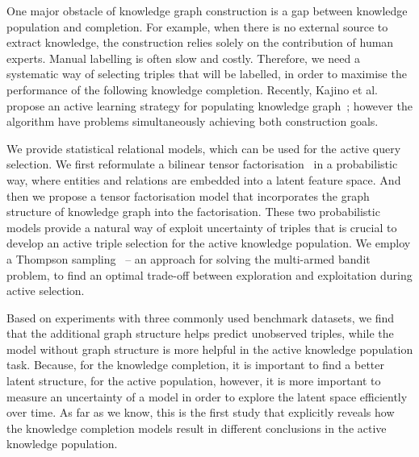 One major obstacle of knowledge graph construction is a gap between knowledge 
population and completion. For example, when there is no external source to extract knowledge,
the construction relies solely on the contribution of human experts.
Manual labelling is often slow and costly. 
Therefore, we need a systematic way of selecting triples that will be labelled, in order to maximise the performance of the following knowledge completion.
Recently, Kajino et al. propose an active learning strategy for populating knowledge graph~\cite{kajino2015active}; 
however the algorithm have problems simultaneously achieving both construction goals.

We provide statistical relational models, which can be used for the active query selection. %
We first reformulate a bilinear tensor factorisation~\cite{nickel2015review} in a probabilistic way, where entities and relations are embedded into a latent feature space. And then we propose a tensor factorisation model that incorporates the graph structure of knowledge graph into the factorisation. These two probabilistic models provide a natural way of exploit uncertainty of triples that is crucial to develop 
an active triple selection for the active knowledge population.
We employ a Thompson sampling~\cite{scott10bandit} -- an approach for solving the multi-armed bandit problem,
to find an optimal trade-off between exploration and exploitation during active selection.

Based on experiments with three commonly used benchmark datasets, we find that the additional graph structure helps predict unobserved triples, while the model without graph structure is more helpful in the active knowledge population task.
Because, for the knowledge completion, it is important to find a better latent structure, for the active population, however, it is more important to measure an uncertainty of a model in order to explore the latent space efficiently over time.
As far as we know, this is the first study that explicitly reveals how the knowledge completion models result in different conclusions in the active knowledge population.

